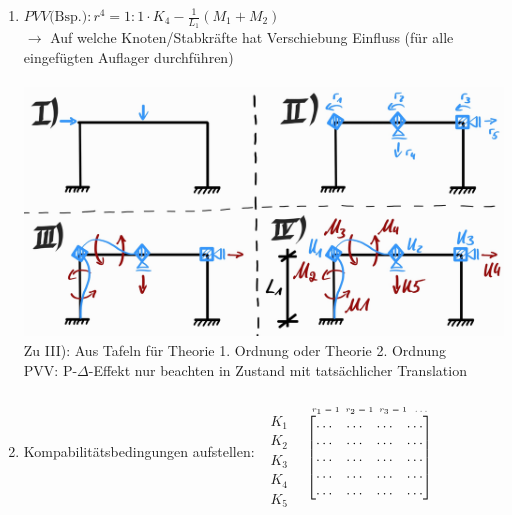 \documentclass[fleqn,twoside]{article}
\begin{document}
\begin{enumerate}
            \item $PVV \text{(Bsp.)}: r^4=1: 1 \cdot K_4-\frac{1}{L_1}\left(M_1+M_2\right)$\\
                $\rightarrow$ Auf welche Knoten/Stabkräfte hat Verschiebung Einfluss (für alle eingefügten Auflager durchführen)\\ \\
                \includegraphics[scale=0.1]{Grafiken/Ablauf VV.jpg}\\
                Zu III): Aus Tafeln für Theorie 1. Ordnung oder Theorie 2. Ordnung\\
                PVV: P-$\Delta$-Effekt nur beachten in Zustand mit tatsächlicher Translation
            \item Kompabilitätsbedingungen aufstellen:\vskip 2mm
                $ \begin{smallmatrix} \phantom{r_1} \\\begin{matrix}  K_1 \\ K_2 \\ K_3 \\ K_4 \\ K_5 \end{matrix} \end{smallmatrix}$ 
                $ \begin{smallmatrix} \textrm{ \tiny $r_1=1 \hspace{1.5mm} r_2=1 \hspace{1.5mm} r_3=1 \hspace{1.5mm} \ldots$ \tiny } \\ \begin{bmatrix}  \ldots &  \ldots &  \ldots &  \ldots \\  \ldots &  \ldots &  \ldots &  \ldots  \\  \ldots &  \ldots &  \ldots &  \ldots  \\  \ldots &  \ldots &  \ldots &  \ldots  \\  \ldots &  \ldots &  \ldots &  \ldots \end{bmatrix} \end{smallmatrix}$

\end{enumerate}
\end{document}
